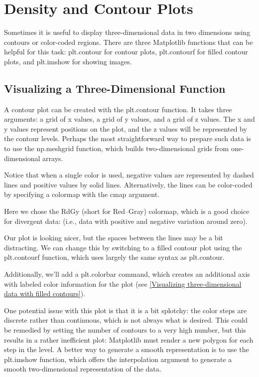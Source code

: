 \chapter{Density and Contour Plots\label{Ch28}}
Sometimes it is useful to display three-dimensional data in two dimensions using
contours or color-coded regions. There are three Matplotlib functions that can be
helpful for this task: plt.contour for contour plots, plt.contourf for filled contour
plots, and plt.imshow for showing images.

\section{Visualizing a Three-Dimensional Function}
A contour plot can be created with the plt.contour function. It takes three arguments: a grid of x values, a grid of y values, and a grid of z values. The x and y values
represent positions on the plot, and the z values will be represented by the contour
levels. Perhaps the most straightforward way to prepare such data is to use the
np.meshgrid function, which builds two-dimensional grids from one-dimensional
arrays.

Notice that when a single color is used, negative values are represented by dashed
lines and positive values by solid lines. Alternatively, the lines can be color-coded by
specifying a colormap with the cmap argument.

Here we chose the RdGy (short for Red–Gray) colormap, which is a good choice for
divergent data: (i.e., data with positive and negative variation around zero).

Our plot is looking nicer, but the spaces between the lines may be a bit distracting.
We can change this by switching to a filled contour plot using the plt.contourf
function, which uses largely the same syntax as plt.contour.

Additionally, we'll add a plt.colorbar command, which creates an additional axis
with labeled color information for the plot (see \autoref{Visualizing three-dimensional data with filled contours}).


One potential issue with this plot is that it is a bit splotchy: the color steps are discrete
rather than continuous, which is not always what is desired. This could be remedied
by setting the number of contours to a very high number, but this results in a rather
inefficient plot: Matplotlib must render a new polygon for each step in the level. A
better way to generate a smooth representation is to use the plt.imshow function,
which offers the interpolation argument to generate a smooth two-dimensional
representation of the data.

